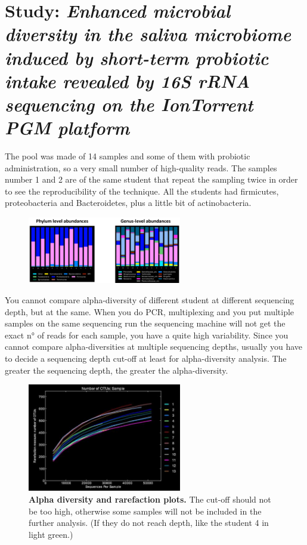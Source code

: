 \section{Study: \textit{Enhanced microbial diversity in the saliva microbiome induced by short-term probiotic intake revealed by 16S rRNA sequencing on the IonTorrent PGM platform}}

The pool was made of 14 samples and some of them with probiotic administration, so a very small number of high-quality reads. The samples number 1 and 2 are of the same student that repeat the sampling twice in order to see the reproducibility of the technique.
All the students had firmicutes, proteobacteria and Bacteroidetes, plus a little bit of actinobacteria.

\begin{figure}[h]
\centering
\includegraphics[width=0.6\textwidth]{Level.png}
\caption{}
\end{figure}

You cannot compare alpha-diversity of different student at different sequencing depth, but at the same.
When you do PCR, multiplexing and you put multiple samples on the same sequencing run the sequencing machine
will not get the exact n° of reads for each sample, you have a quite high variability. Since you cannot compare alpha-diversities at multiple sequencing depths, usually you have to decide a sequencing depth cut-off at least for alpha-diversity analysis. The greater the sequencing depth, the greater the alpha-diversity. 

\begin{figure}[h]
\centering
\includegraphics[width=0.6\textwidth]{AlphaDiversity.png}
\caption{\textbf{Alpha diversity and rarefaction plots.} The cut-off should not be too high, otherwise some samples will not be included in the further analysis. (If they do not reach depth, like the student 4 in light green.)}
\end{figure}

